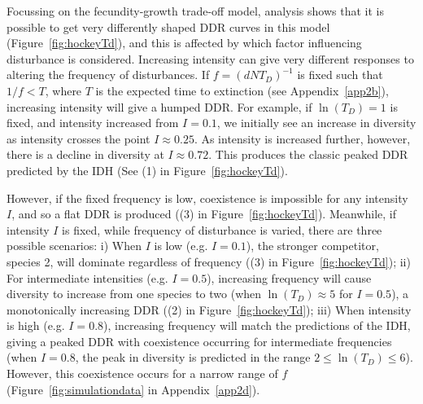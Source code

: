 \documentclass[a4paper]{article}
\begin{document}
Focussing on the fecundity-growth trade-off model, analysis shows that it is possible to get very differently shaped DDR curves in this model (Figure~\ref{fig:hockeyTd}), and this is affected by which factor influencing disturbance is considered. Increasing intensity can give very different responses to altering the frequency of disturbances. If $f=(dNT_D)^{-1}$ is fixed such that $1/f<T$, where $T$ is the expected time to extinction (see Appendix~\ref{app2b}), increasing intensity will give a humped DDR. For example, if $\ln(T_D)=1$ is fixed, and intensity increased from $I=0.1$, we initially see an increase in diversity as intensity crosses the point $I\approx0.25$. As intensity is increased further, however, there is a decline in diversity at $I\approx0.72$. This produces the classic peaked DDR predicted by the IDH (See (1) in Figure~\ref{fig:hockeyTd}).

However, if the fixed frequency is low, coexistence is impossible for any intensity $I$, and so a flat DDR is produced ((3) in Figure~\ref{fig:hockeyTd}). Meanwhile, if intensity $I$ is fixed, while frequency of disturbance is varied, there are three possible scenarios: i) When $I$ is low (e.g. $I=0.1$), the stronger competitor, species 2, will dominate regardless of frequency ((3) in Figure~\ref{fig:hockeyTd}); ii) For intermediate intensities (e.g. $I=0.5$), increasing frequency will cause diversity to increase from one species to two (when $\ln(T_D)\approx 5$ for $I=0.5$), a monotonically increasing DDR ((2) in Figure~\ref{fig:hockeyTd}); iii) When intensity is high (e.g. $I=0.8$), increasing frequency will match the predictions of the IDH, giving a peaked DDR with coexistence occurring for intermediate frequencies (when $I=0.8$, the peak in diversity is predicted in the range $2\leq \ln(T_D) \leq 6$). However, this coexistence occurs for a narrow range of $f$ (Figure~\ref{fig:simulationdata} in Appendix~\ref{app2d}).
\end{document}
